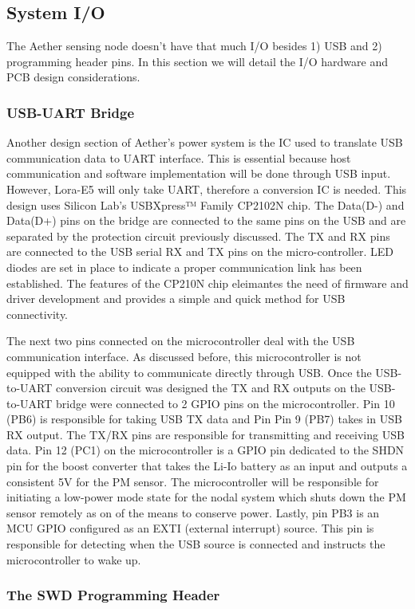 \subsection{System I/O}
The Aether sensing node doesn't have that much I/O besides 1) USB and 2)
programming header pins. In this section we will detail the I/O hardware and PCB
design considerations.

\subsubsection{USB-UART Bridge}
Another design section of Aether's power system is the IC used to translate USB communication data to UART interface. This is essential because host communication and software implementation will be done through USB input. However, Lora-E5 will only take UART, therefore a conversion IC is needed. This design uses Silicon Lab's USBXpress™ Family CP2102N chip. The Data(D-) and Data(D+) pins on the bridge are connected to the same pins on the USB and are separated by the protection circuit previously discussed. The TX and RX pins are connected to the USB serial RX and TX pins on the micro-controller. LED diodes are set in place to indicate a proper communication link has been established. The features of the CP210N chip eleimantes the need of firmware and driver development and provides a simple and quick method for USB connectivity.

The next two pins connected on the microcontroller deal with the USB communication interface. As discussed before, this microcontroller is not equipped with the ability to communicate directly through USB. Once the USB-to-UART conversion circuit was designed the TX and RX outputs on the USB-to-UART bridge were connected to 2 GPIO pins on the microcontroller. Pin 10 (PB6) is responsible for taking USB TX data and Pin Pin 9 (PB7) takes in USB RX output. The TX/RX pins are responsible for transmitting and receiving USB data. Pin 12 (PC1) on the microcontroller is a GPIO pin dedicated to the SHDN pin for the boost converter that takes the Li-Io battery as an input and outputs a consistent 5V for the PM sensor. The microcontroller will be responsible for initiating a low-power mode state for the nodal system which shuts down the PM sensor remotely as on of the means to conserve power. Lastly, pin PB3 is an MCU GPIO configured as an EXTI (external interrupt) source. This pin is responsible for detecting when the USB source is connected and instructs the microcontroller to wake up. 

\subsubsection{The SWD Programming Header}
